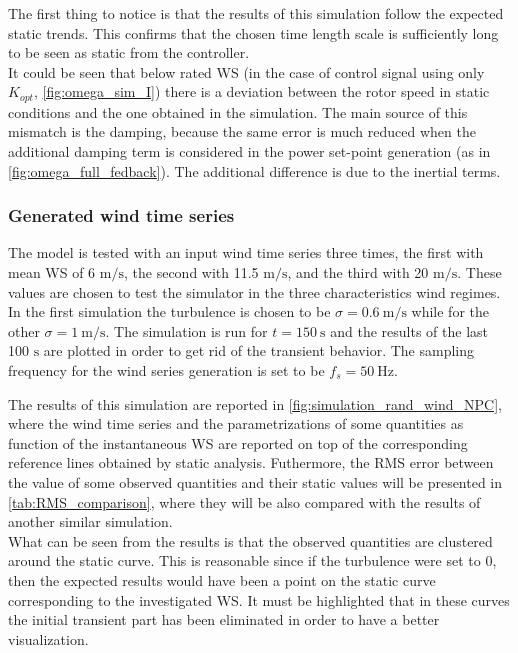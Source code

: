 

The first thing to notice is that the results of this simulation follow the expected static trends. This confirms that the chosen time length scale is sufficiently long to be seen as static from the controller. \\
It could be seen that below rated WS (in the case of control signal using only $K_{opt}$, \autoref{fig:omega_sim_I}) there is a deviation between the rotor speed in static conditions and the one obtained in the simulation. The main source of this mismatch is the damping, because the same error is much reduced when the additional damping term is considered in the power set-point generation (as in \autoref{fig:omega_full_fedback}). The additional difference is due to the inertial terms. 

\subsubsection{Generated wind time series}\label{sec:wind_series_sim}
The model is tested with an input wind time series three times, the first with mean \acrshort{WS} of 6 $\si{\meter\per\second}$, the second with 11.5 $\si{\meter\per\second}$, and the third with 20 $\si{\meter\per\second}$. These values are chosen to test the simulator in the three characteristics wind regimes. In the first simulation the turbulence is chosen to be $\sigma=0.6 \ \si{\meter\per\second}$ while for the other $\sigma=1 \ \si{\meter\per\second}$. The simulation is run for $t=150 \ \si{\second}$ and the results of the last 100 $\si{\second}$ are plotted in order to get rid of the transient behavior. The sampling frequency for the wind series generation is set to be $f_s=50 \ \si{\hertz}$.

The results of this simulation are reported in \autoref{fig:simulation_rand_wind_NPC}, where the wind time series and the parametrizations of some quantities as function of the instantaneous WS are reported on top of the corresponding reference lines obtained by static analysis. Futhermore, the \acrfull{RMS} error between the value of some observed quantities and their static values will be presented in \autoref{tab:RMS_comparison}, where they will be also compared with the results of another similar simulation. \\
What can be seen from the results is that the observed quantities are clustered around the static curve. This is reasonable since if the turbulence were set to 0, then the expected results would have been a point on the static curve corresponding to the investigated WS. It must be highlighted that in these curves the initial transient part has been eliminated in order to have a better visualization. 

